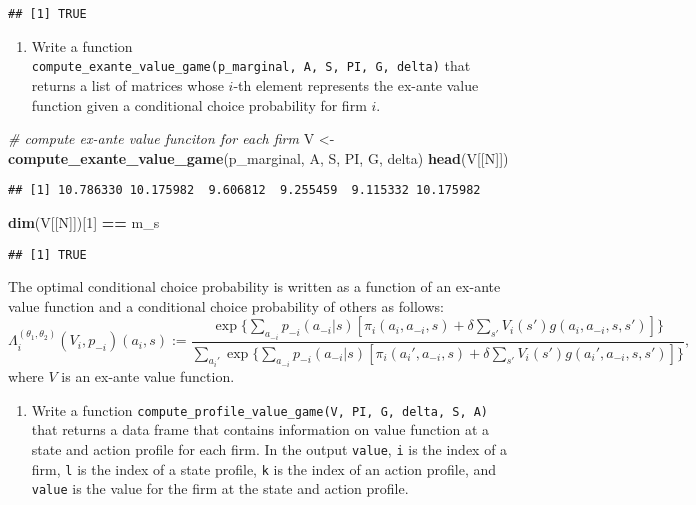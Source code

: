 \documentclass[
]{book}
\newenvironment{Shaded}{\begin{snugshade}}{\end{snugshade}}
\newcommand{\CommentTok}[1]{\textcolor[rgb]{0.56,0.35,0.01}{\textit{#1}}}
\newcommand{\DecValTok}[1]{\textcolor[rgb]{0.00,0.00,0.81}{#1}}
\newcommand{\KeywordTok}[1]{\textcolor[rgb]{0.13,0.29,0.53}{\textbf{#1}}}
\newcommand{\NormalTok}[1]{#1}
\newcommand{\OperatorTok}[1]{\textcolor[rgb]{0.81,0.36,0.00}{\textbf{#1}}}
\newcommand{\StringTok}[1]{\textcolor[rgb]{0.31,0.60,0.02}{#1}}
\providecommand{\tightlist}{%
  \setlength{\itemsep}{0pt}\setlength{\parskip}{0pt}}
\begin{document}
\begin{verbatim}
## [1] TRUE
\end{verbatim}

\begin{enumerate}
\def\labelenumi{\arabic{enumi}.}
\setcounter{enumi}{6}
\tightlist
\item
  Write a function \texttt{compute\_exante\_value\_game(p\_marginal,\ A,\ S,\ PI,\ G,\ delta)} that returns a list of matrices whose \(i\)-th element represents the ex-ante value function given a conditional choice probability for firm \(i\).
\end{enumerate}

\begin{Shaded}
\begin{Highlighting}[]
\CommentTok{# compute ex-ante value funciton for each firm}
\NormalTok{V <-}\StringTok{ }\KeywordTok{compute_exante_value_game}\NormalTok{(p_marginal, A, S, PI, G, delta)}
\KeywordTok{head}\NormalTok{(V[[N]])}
\end{Highlighting}
\end{Shaded}

\begin{verbatim}
## [1] 10.786330 10.175982  9.606812  9.255459  9.115332 10.175982
\end{verbatim}

\begin{Shaded}
\begin{Highlighting}[]
\KeywordTok{dim}\NormalTok{(V[[N]])[}\DecValTok{1}\NormalTok{] }\OperatorTok{==}\StringTok{ }\NormalTok{m_s}
\end{Highlighting}
\end{Shaded}

\begin{verbatim}
## [1] TRUE
\end{verbatim}

The optimal conditional choice probability is written as a function of an ex-ante value function and a conditional choice probability of others as follows:
\[
\Lambda_i^{(\theta_1, \theta_2)}(V_i, p_{-i})(a_i, s) := \frac{\exp\{\sum_{a_{-i}}p_{-i}(a_{-i}|s)[\pi_i(a_i, a_{-i}, s) + \delta \sum_{s'}V_i(s')g(a_i, a_{-i}, s, s')]\}}{\sum_{a_i'}\exp\{\sum_{a_{-i}}p_{-i}(a_{-i}|s)[\pi_i(a_i', a_{-i}, s) + \delta \sum_{s'}V_i(s')g(a_i', a_{-i}, s, s')]\}},
\]
where \(V\) is an ex-ante value function.

\begin{enumerate}
\def\labelenumi{\arabic{enumi}.}
\setcounter{enumi}{7}
\tightlist
\item
  Write a function \texttt{compute\_profile\_value\_game(V,\ PI,\ G,\ delta,\ S,\ A)} that returns a data frame that contains information on value function at a state and action profile for each firm. In the output \texttt{value}, \texttt{i} is the index of a firm, \texttt{l} is the index of a state profile, \texttt{k} is the index of an action profile, and \texttt{value} is the value for the firm at the state and action profile.
\end{enumerate}
\end{document}
